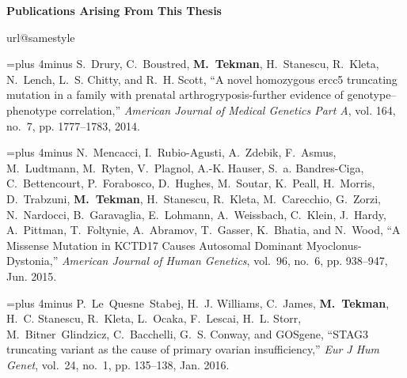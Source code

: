 \pagebreak
{\noindent \bf Publications Arising From This Thesis}\\

\begingroup
\renewcommand{\chapter}[2]{}%
\begin{thebibliography}{10}
\providecommand{\url}[1]{#1}
\csname url@samestyle\endcsname
\providecommand{\newblock}{\relax}
\providecommand{\bibinfo}[2]{#2}
\providecommand{\BIBentrySTDinterwordspacing}{\spaceskip=0pt\relax}
\providecommand{\BIBentryALTinterwordstretchfactor}{4}
\providecommand{\BIBentryALTinterwordspacing}{\spaceskip=\fontdimen2\font plus
\BIBentryALTinterwordstretchfactor\fontdimen3\font minus
  \fontdimen4\font\relax}
\providecommand{\BIBforeignlanguage}[2]{{%
\expandafter\ifx\csname l@#1\endcsname\relax
\typeout{** WARNING: IEEEtran.bst: No hyphenation pattern has been}%
\typeout{** loaded for the language `#1'. Using the pattern for}%
\typeout{** the default language instead.}%
\else
\language=\csname l@#1\endcsname
\fi
#2}}
\providecommand{\BIBdecl}{\relax}

\BIBentryALTinterwordspacing
S.~Drury, C.~Boustred, \textbf{M.~Tekman}, H.~Stanescu, R.~Kleta, N.~Lench, L.~S.
  Chitty, and R.~H. Scott, ``A novel homozygous ercc5 truncating mutation in a
  family with prenatal arthrogryposis-further evidence of genotype–phenotype
  correlation,'' \emph{American Journal of Medical Genetics Part A}, vol. 164,
  no.~7, pp. 1777--1783, 2014.
\BIBentrySTDinterwordspacing

\BIBentryALTinterwordspacing
N.~Mencacci, I.~Rubio-Agusti, A.~Zdebik, F.~Asmus, M.~Ludtmann, M.~Ryten,
  V.~Plagnol, A.-K. Hauser, S.~a. Bandres-Ciga, C.~Bettencourt, P.~Forabosco,
  D.~Hughes, M.~Soutar, K.~Peall, H.~Morris, D.~Trabzuni, \textbf{M.~Tekman},
  H.~Stanescu, R.~Kleta, M.~Carecchio, G.~Zorzi, N.~Nardocci, B.~Garavaglia,
  E.~Lohmann, A.~Weissbach, C.~Klein, J.~Hardy, A.~Pittman, T.~Foltynie,
  A.~Abramov, T.~Gasser, K.~Bhatia, and N.~Wood, ``A {Missense} {Mutation} in
  {KCTD}17 {Causes} {Autosomal} {Dominant} {Myoclonus}-{Dystonia},''
  \emph{American Journal of Human Genetics}, vol.~96, no.~6, pp. 938--947, Jun.
  2015.
\BIBentrySTDinterwordspacing

\BIBentryALTinterwordspacing
P.~Le~Quesne~Stabej, H.~J. Williams, C.~James, \textbf{M.~Tekman}, H.~C. Stanescu,
  R.~Kleta, L.~Ocaka, F.~Lescai, H.~L. Storr, M.~Bitner~Glindzicz,
  C.~Bacchelli, G.~S. Conway, and {GOSgene}, ``{STAG}3 truncating variant as
  the cause of primary ovarian insufficiency,'' \emph{Eur J Hum Genet},
  vol.~24, no.~1, pp. 135--138, Jan. 2016.
\BIBentrySTDinterwordspacing


\end{thebibliography}
